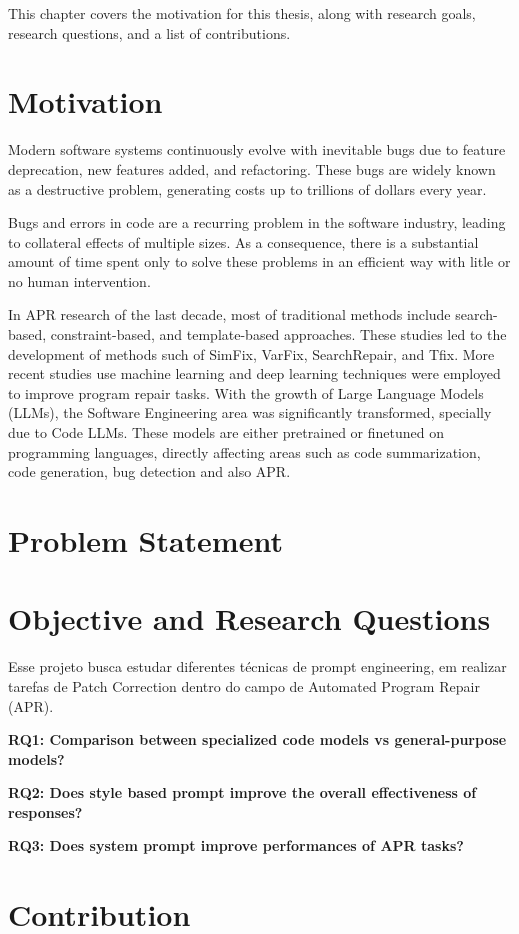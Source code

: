This chapter covers the motivation for this thesis, along with research goals, research
questions, and a list of contributions.

\section{Motivation}
Modern software systems continuously evolve with inevitable bugs due to feature deprecation, new features added, and refactoring. These bugs are widely known as a destructive problem, generating costs up to trillions of dollars every year.%

Bugs and errors in code are a recurring problem in the software industry, leading to collateral effects of multiple sizes. %
As a consequence, there is a substantial amount of time spent only to solve these problems in an efficient way with litle or no human intervention.

In APR research of the last decade, most of traditional methods include search-based, constraint-based, and template-based approaches.%
These studies led to the development of methods such of SimFix, VarFix, SearchRepair, and Tfix.
More recent studies use machine learning and deep learning techniques were employed to improve program repair tasks.
With the growth of Large Language Models (LLMs), the Software Engineering area was significantly transformed, specially due to Code LLMs. These models are either pretrained or finetuned on programming languages, directly affecting areas such as code summarization, code generation, bug detection and also APR.






\section{Problem Statement}


\section{Objective and Research Questions} 
Esse projeto busca estudar diferentes técnicas de prompt engineering, em realizar tarefas de Patch Correction dentro do campo de Automated Program Repair (APR).


\textbf{RQ1: Comparison between specialized code models vs general-purpose models?}

\textbf{RQ2: Does style based prompt improve the overall effectiveness of responses?}

\textbf{RQ3: Does system prompt improve performances of APR tasks?}


\section{Contribution}